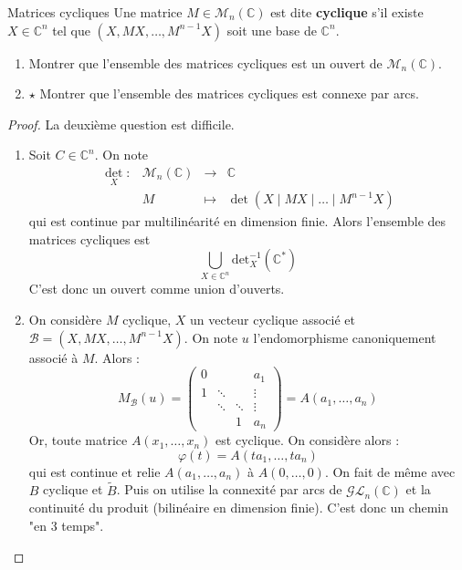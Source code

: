 \documentclass[french,a4paper]{article}
\newcommand{\C}{\mathbb{C}}
\newcommand{\st}{^*}
\newcommand{\inv}{^{-1}}
\theoremstyle{plain}
\theoremstyle{definition}
\theoremstyle{remark}
\begin{document}
\begin{ex}{Matrices cycliques}
	Une matrice $M\in\mathcal{M}_n(\C)$ est dite \textbf{cyclique} s'il existe $X\in\C^n$ tel que $(X,MX,\ldots,M^{n-1}X)$ soit une base de $\C^n$.
	\begin{enumerate}
		\item Montrer que l'ensemble des matrices cycliques est un ouvert de $\mathcal{M}_n(\C)$.
		\item $\star$ Montrer que l'ensemble des matrices cycliques est connexe par arcs.
	\end{enumerate}
\end{ex}
\begin{proof}
	La deuxième question est difficile.
	\begin{enumerate}
		\item Soit $C\in\C^n$. On note $$\begin{array}{lrcl}
			\det_X:&\mathcal{M}_n(\C)&\longrightarrow&\C\\
			&M&\longmapsto&\det(X\mid MX\mid\ldots\mid M^{n-1}X)
		\end{array}$$ qui est continue par multilinéarité en dimension finie. Alors l'ensemble des matrices cycliques est $$\bigcup_{X\in\C^n}\text{det}_X\inv(\C\st)$$ C'est donc un ouvert comme union d'ouverts.
		\item On considère $M$ cyclique, $X$ un vecteur cyclique associé et $\mathcal{B}=(X,MX,\ldots,M^{n-1}X)$. On note $u$ l'endomorphisme canoniquement associé à $M$. Alors : $$M_\mathcal{B}(u)=\begin{pmatrix}
			0&&&a_1\\
			1&\ddots&&\vdots\\
			&\ddots&\ddots&\vdots\\
			&&1&a_n
		\end{pmatrix}=A(a_1,\ldots,a_n)$$ Or, toute matrice $A(x_1,\ldots,x_n)$ est cyclique. On considère alors : $$\varphi(t)=A(ta_1,\ldots,ta_n)$$ qui est continue et relie $A(a_1,\ldots,a_n)$ à $A(0,\ldots,0)$. On fait de même avec $B$ cyclique et $\tilde{B}$. Puis on utilise la connexité par arcs de $\mathcal{GL}_n(\C)$ et la continuité du produit (bilinéaire en dimension finie). C'est donc un chemin "en 3 temps".
	\end{enumerate}
\end{proof}
\end{document}
